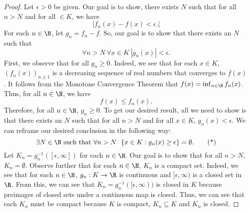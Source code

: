\begin{proof}
Let \( \epsilon > 0 \) be given. Our goal is to show, there exists \( N  \) such that for all \( n > N  \) and for all \(  \in K  \), we have 
\[  | {f}_{n}(x) - f(x) < \epsilon. |  \]
For each \( n \in \N  \), let \( {g}_{n} = {f}_{n} - f  \). So, our goal is to show that there exists an \( N  \) such that 
\[  \forall n > N \ \forall x \in K \ | {g}_{n}(x) |  < \epsilon. \]
First, we observe that for all \( {g}_{n} \geq 0  \). Indeed, we see that for each \( x \in K  \), \( ({f}_{n}(x))_{n \geq 1 } \) is a decreasing sequence of real numbers that converges to \( f(x) \). It follows from the Monotone Convergence Theorem that \( f(x) = \inf_{n \in \N} {f}_{n}(x) \). Thus, for all \( n \in \N  \), we have
\[  f(x) \leq {f}_{n}(x). \]
Therefore, for all \( n \in \N  \), \( {g}_{n} \geq  0  \). To get our desired result, all we need to show is that there exists an \( N  \) such that for all \( n > N  \) and for all \( x \in K  \), \( {g}_{n}(x) < \epsilon \). We can reframe our desired conclusion in the following way: 
\[  \exists N \in \N \ \text{such that} \ \forall n > N \ \ \{ x \in K : {g}_{n}(x) \geq \epsilon  \}  = \emptyset. \tag{*} \] Let \( {K}_{n} = {g}_{n}^{-1}([\epsilon, \infty ]) \) for each \( n \in \N  \). Our goal is to show that for all \(  n > N  \), \( {K}_{n} = \emptyset \). Observe further that for each \( n \in \N  \), \( {K}_{n} \) is a compact set. Indeed, we see that for each \( n \in \N  \), \( {g}_{n} : K \to \R  \) is continuous and \( [\epsilon, \infty) \) is a closed set in \( \R  \). From this, we can see that \( {K}_{n} = {g}_{n}^{-1}([\epsilon,\infty) )  \) is closed in \( K  \) because preimages of closed sets under a continuous map is closed. Thus, we can see that each \( {K}_{n} \) must be compact because \( K  \) is compact, \( {K}_{n} \subseteq  K \)  and \( {K}_{n}  \) is closed. 


\end{proof}
